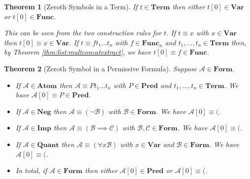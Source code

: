 \documentclass[12pt]{article}
\theoremstyle{break}
\theoremstyle{break}
\newtheorem{theorem}{Theorem}[section]
\theoremstyle{break}
\theoremstyle{break}
\theoremstyle{break}
\newtheorem{informal definition}[definition]{Informal Definition}
\newcommand{\mc}[1]{\mathcal{#1}}
\begin{document}
\begin{theorem}[Zeroth Symbols in a Term]
\label{thm:read:zerothsymbterm}
If $t\in \textbf{Term}$ then either $t[0]\in\textbf{Var}$ or $t[0]\in\textbf{Func}$.

This can be seen from the two construction rules for $t$.
If $t\equiv x$ with $x\in\textbf{Var}$ then $t[0]\equiv x \in\textbf{Var}$.
If $t\equiv f t_1\ldots t_n$ with $f\in\textbf{Func}_n$ and $t_1,\ldots, t_n\in\textbf{Term}$ then, by Theorem \ref{thm:list:multconcatextract}, we have $t[0] \equiv f \in \textbf{Func}$.
\end{theorem}

\begin{theorem}[Zeroth Symbol in a Permissive Formula]
\label{thm:read:zerothsymbpform}
Suppose $\mc{A}\in\textbf{Form}$.
\begin{itemize}
\item{If $\mc{A}\in\textbf{Atom}$ then $\mc{A}\equiv Pt_1\ldots t_n$ with $P\in\textbf{Pred}$ and $t_1,\ldots,t_n\in\textbf{Term}$. We have $\mc{A}[0] \equiv P \in \textbf{Pred}$.}
\item{If $\mc{A}\in\textbf{Neg}$ then $\mc{A}\equiv (\lnot \mc{B})$ with $\mc{B}\in\textbf{Form}$. We have $\mc{A}[0] \equiv ($.}
\item{If $\mc{A}\in\textbf{Imp}$ then $\mc{A}\equiv(\mc{B}\implies \mc{C})$ with $\mc{B}, \mc{C} \in \textbf{Form}$. We have $\mc{A}[0] \equiv ($.}
\item{If $\mc{A}\in\textbf{Quant}$ then $\mc{A}\equiv (\forall x \mc{B})$ with $x\in\textbf{Var}$ and $\mc{B}\in\textbf{Form}$. We have $\mc{A}[0] \equiv ($.}
\item{In total, if $\mc{A}\in\textbf{Form}$ then either $\mc{A}[0] \in \textbf{Pred}$ or $\mc{A}[0] \equiv ($.}
\end{itemize}
\end{theorem}
\end{document}
